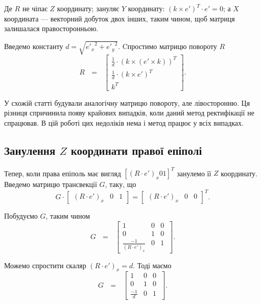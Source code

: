 Де $R$ не чіпає $Z$ координату; зануляє $Y$ координату: 
${(k \times e')}^T \cdot e' = 0$; а $X$ координата --- векторний добуток
двох інших, таким чином, щоб матриця залишалася правосторонньою.

Введемо константу $d = \sqrt{{e'_x}^2 + {e'_y}^2}$. Cпростимо матрицю повороту $R$
\begin{equation}
R \:\:\: = \:\:\:\left[
\begin{matrix}
\frac{1}{d} \cdot {(k \times (e' \times k))}^T\\
\frac{1}{d} \cdot {(k \times e')}^T\\
k^T\
\end{matrix}
\right].
\end{equation}

У схожій статті \cite{} будували аналогічну матрицю повороту, але лівосторонню.
Ця різниця спричинила появу крайових випадків, коли даний метод ректифікації
не спрацював. В цій роботі цих недоліків нема і метод працює у всіх випадках.


\subsection{Занулення $Z$ координати правої епіполі}
Тепер, коли права епіполь має вигляд ${[(R \cdot e')_x 0 1]}^T$ занулемо її
$Z$ координату. Введемо матрицю трансвекції $G$, таку, що
\begin{equation}
G \cdot 
\begin{bmatrix}
(R \cdot e')_x & 0 & 1
\end{bmatrix}
 = {
\begin{bmatrix}
(R \cdot e')_x & 0 & 0
\end{bmatrix}
}^T.
\end{equation}

Побудуємо $G$, таким чином 
\begin{equation}
G \:\:\: = \:\:\:\left[
\begin{matrix}
1 & 0 & 0\\
0 & 1 & 0\\
\frac{-1}{{(R \cdot e')}_x} & 0 & 1\
\end{matrix}
\right].
\end{equation}

Можемо спростити скаляр ${(R \cdot e')}_x = d$. Тоді маємо 
\begin{equation}
G \:\:\: = \:\:\:\left[
\begin{matrix}
1 & 0 & 0\\
0 & 1 & 0\\
\frac{-1}{d} & 0 & 1\
\end{matrix}
\right].
\end{equation}

